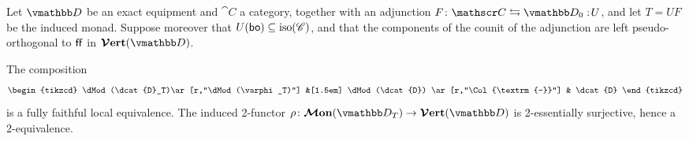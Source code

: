 \documentclass[12pt,oneside,article,draft]{memoir}
\begin{document}
\begin{theorem}\label{thm:ffle_and_verts}
   Let $\dcat{D}$ be an exact equipment and $\cat{C}$ a category, together with an adjunction
   $F\colon\cat{C}\leftrightarrows\dcat{D}_0:\!U$, and let $T=UF$ be the induced monad. Suppose
   moreover that $U(\mathsf{bo})\subseteq\mathrm{iso}(\mathscr{C})$, and that the components of the counit of
   the adjunction are left pseudo-orthogonal to $\mathsf{ff}$ in $\VVer(\dcat{D})$.

   The composition
   \begin{equation*}
      \begin{tikzcd}
         \dMod(\dcat{D}_T)\ar[r,"\dMod(\varphi_T)"] &[1.5em] \dMod(\dcat{D}) \ar[r,"\Col{\textrm{--}}"] & \dcat{D}
      \end{tikzcd}
   \end{equation*}
   is a fully faithful local equivalence. The induced 2-functor
   $\rho\colon\MMon(\dcat{D}_T)\to\VVer(\dcat{D})$ is 2-essentially surjective, hence a 2-equivalence.
\end{theorem}
\end{document}
